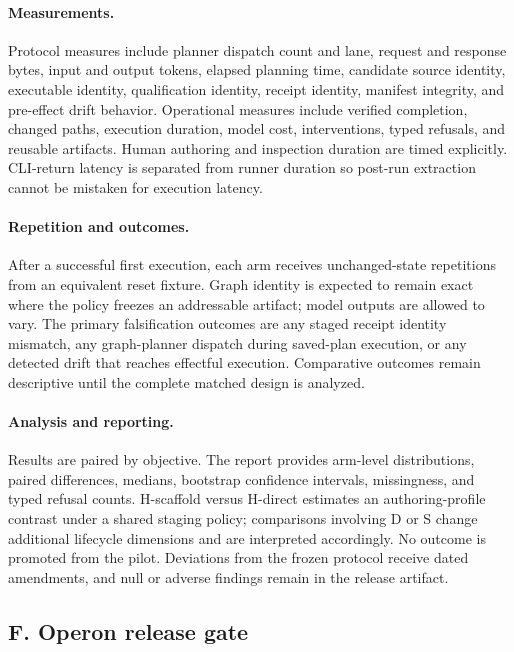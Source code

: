 \documentclass[11pt]{article}
\begin{document}
\paragraph{Measurements.}
Protocol measures include planner dispatch count and lane, request and response
bytes, input and output tokens, elapsed planning time, candidate source
identity, executable identity, qualification identity, receipt identity,
manifest integrity, and pre-effect drift behavior. Operational measures
include verified completion, changed paths, execution duration, model cost,
interventions, typed refusals, and reusable artifacts. Human authoring and
inspection duration are timed explicitly. CLI-return latency is separated
from runner duration so post-run extraction cannot be mistaken for execution
latency.

\paragraph{Repetition and outcomes.}
After a successful first execution, each arm receives
\RegisteredRepeatCount{} unchanged-state repetitions from an equivalent reset
fixture. Graph identity is expected to remain exact where the policy freezes
an addressable artifact; model outputs are allowed to vary. The primary
falsification outcomes are any staged receipt identity mismatch, any
graph-planner dispatch during saved-plan execution, or any detected drift that
reaches effectful execution. Comparative outcomes remain descriptive until
the complete matched design is analyzed.

\paragraph{Analysis and reporting.}
Results are paired by objective. The report provides arm-level distributions,
paired differences, medians, bootstrap confidence intervals, missingness, and
typed refusal counts. H-scaffold versus H-direct estimates an authoring-profile
contrast under a shared staging policy; comparisons involving D or S change
additional lifecycle dimensions and are interpreted accordingly. No outcome
is promoted from the pilot. Deviations from the frozen protocol receive dated
amendments, and null or adverse findings remain in the release artifact.

\ifdefined\InternalBuild
  \subsection*{F. Operon release gate}
\end{document}
